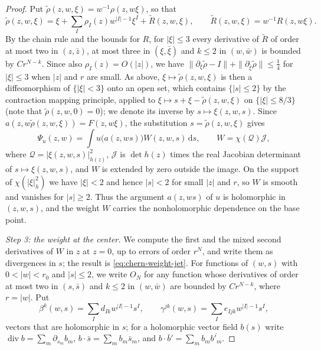 \begin{proof}
Put $\tilde\rho(z,w,\xi)=w^{-1}\rho(z,w\xi)$, so that
\[
 \tilde\rho(z,w,\xi)=\xi+\sum_I\rho_I(z)w^{|I|-1}\xi^I+\tilde R(z,w,\xi),\qquad \tilde R(z,w,\xi)=w^{-1}R(z,w\xi).
\]
By the chain rule and the bounds for $R$, for $|\xi|\leq3$ every derivative of $\tilde R$ of order at most two in $(z,\bar z)$, at most three in $(\xi,\bar\xi)$ and $k\leq2$ in $(w,\bar w)$ is bounded by $Cr^{N-k}$. Since also $\rho_I(z)=O(|z|)$, we have $\|\partial_\xi\tilde\rho-I\|+\|\partial_{\bar\xi}\tilde\rho\|\leq\frac14$ for $|\xi|\leq3$ when $|z|$ and $r$ are small. As above, $\xi\mapsto\tilde\rho(z,w,\xi)$ is then a diffeomorphism of $\{|\xi|<3\}$ onto an open set, which contains $\{|s|\leq2\}$ by the contraction mapping principle, applied to $\xi\mapsto s+\xi-\tilde\rho(z,w,\xi)$ on $\{|\xi|\leq8/3\}$ (note that $\tilde\rho(z,w,0)=0$); we denote its inverse by $s\mapsto\xi(z,w,s)$. Since $a(z,w\tilde\rho(z,w,\xi))=F(z,w\xi)$, the substitution $s=\tilde\rho(z,w,\xi)$ gives
\[
 \Psi_u(z,w)=\int u\bigl(a(z,ws)\bigr)W(z,w,s)\,\mathrm ds,\qquad W=\chi(\mathcal Q)\mathcal J,
\]
where $\mathcal Q=|\xi(z,w,s)|^2_{h(z)}$, $\mathcal J$ is $\det h(z)$ times the real Jacobian determinant of $s\mapsto\xi(z,w,s)$, and $W$ is extended by zero outside the image. On the support of $\chi(|\xi|_h^2)$ we have $|\xi|<2$ and hence $|s|<2$ for small $|z|$ and $r$, so $W$ is smooth and vanishes for $|s|\geq2$. Thus the argument $a(z,ws)$ of $u$ is holomorphic in $(z,w,s)$, and the weight $W$ carries the nonholomorphic dependence on the base point.

\emph{Step 3: the weight at the center.} We compute the first and the mixed second derivatives of $W$ in $z$ at $z=0$, up to errors of order $r^N$, and write them as divergences in $s$; the result is \eqref{eq:chern-weight-jet}. For functions of $(w,s)$ with $0<|w|<r_0$ and $|s|\leq2$, we write $O_N$ for any function whose derivatives of order at most two in $(s,\bar s)$ and $k\leq2$ in $(w,\bar w)$ are bounded by $Cr^{N-k}$, where $r=|w|$. Put
\[
 \beta^k(w,s)=\sum_Id_{Ik}w^{|I|-1}s^I,\qquad \gamma^{jk}(w,s)=\sum_Ie_{Ijk}w^{|I|-1}s^I,
\]
vectors that are holomorphic in $s$; for a holomorphic vector field $b(s)$ write $\operatorname{div}b=\sum_m\partial_{s_m}b_m$, $b\cdot\bar s=\sum_mb_m\bar s_m$, and $b\cdot\bar b'=\sum_mb_m\overline{b'_m}$.


\end{proof}
